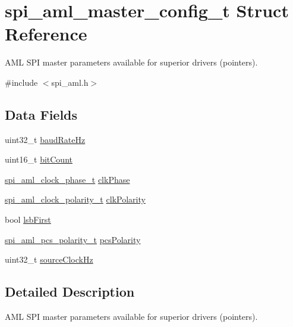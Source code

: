 \hypertarget{structspi__aml__master__config__t}{}\section{spi\+\_\+aml\+\_\+master\+\_\+config\+\_\+t Struct Reference}
\label{structspi__aml__master__config__t}


A\+ML S\+PI master parameters available for superior drivers (pointers).  




{\ttfamily \#include $<$spi\+\_\+aml.\+h$>$}

\subsection*{Data Fields}
\begin{DoxyCompactItemize}
\item 
uint32\+\_\+t \mbox{\hyperlink{structspi__aml__master__config__t_a6d3034fecd72dea96793c13f8c6340cd}{baud\+Rate\+Hz}}
\item 
uint16\+\_\+t \mbox{\hyperlink{structspi__aml__master__config__t_afcc9f66e274f7e690549d5d216970d73}{bit\+Count}}
\item 
\mbox{\hyperlink{group__enum__group_gaa95bcc4aa184cc2df42df55e6d8c2d3a}{spi\+\_\+aml\+\_\+clock\+\_\+phase\+\_\+t}} \mbox{\hyperlink{structspi__aml__master__config__t_a8369385e8658ba5c7a74897397ce0a85}{clk\+Phase}}
\item 
\mbox{\hyperlink{group__enum__group_ga846bf859b73b0a584889013e680bdc5f}{spi\+\_\+aml\+\_\+clock\+\_\+polarity\+\_\+t}} \mbox{\hyperlink{structspi__aml__master__config__t_a732dd1442ee0b3aa8d353fcd9d84a99f}{clk\+Polarity}}
\item 
bool \mbox{\hyperlink{structspi__aml__master__config__t_af684ebd7127978006da4f66fd4b1bf9a}{lsb\+First}}
\item 
\mbox{\hyperlink{group__enum__group_ga376ab165389ceb9a6e3f763263ff7e06}{spi\+\_\+aml\+\_\+pcs\+\_\+polarity\+\_\+t}} \mbox{\hyperlink{structspi__aml__master__config__t_a5ab3ca2262578bfbad4d009e8c12d416}{pcs\+Polarity}}
\item 
uint32\+\_\+t \mbox{\hyperlink{structspi__aml__master__config__t_a47e9c4d5c767c92424f3d50187d3514b}{source\+Clock\+Hz}}
\end{DoxyCompactItemize}


\subsection{Detailed Description}
A\+ML S\+PI master parameters available for superior drivers (pointers). 

